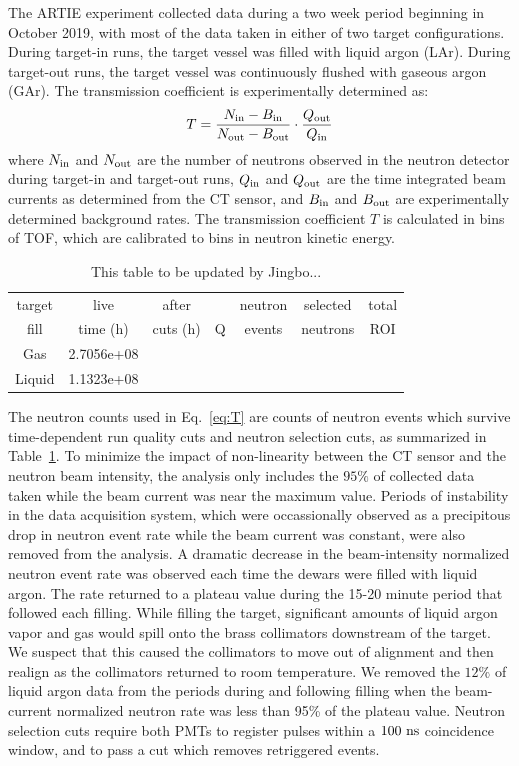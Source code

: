 \documentclass[%
 reprint,
superscriptaddress,
 preprintnumbers,
 nofootinbib,
 nobibnotes,
 bibnotes,
 amsmath,amssymb,
 aps,
 prl, 
 floatfix,
]{revtex4-1}
\begin{document}
The ARTIE experiment collected data during a two week period beginning
in October 2019, with most of the data taken in either of two target
configurations.  During target-in runs, the target vessel was filled
with liquid argon (LAr).  During target-out runs, the target vessel
was continuously flushed with gaseous argon (GAr).  The transmission
coefficient is experimentally determined as:
\begin{equation}
T = \frac{N_{\rm in} - B_{\rm in}}{N_{\rm out} - B_{\rm out}}\cdot\frac{Q_{\rm out}}{Q_{\rm in}}
\label{eq:T}
\end{equation}
where $N_{\rm in}$ and $N_{\rm out}$ are the number of neutrons
observed in the neutron detector during target-in and target-out runs,
$Q_{\rm in}$ and $Q_{\rm out}$ are the time integrated beam currents
as determined from the CT sensor, and $B_{\rm in}$ and $B_{\rm out}$
are experimentally determined background rates.  The transmission
coefficient $T$ is calculated in bins of TOF, which are calibrated to bins in neutron kinetic energy.

\begin{table}[htb]
\begin{tabular}{|c|c|c|c|c|c|c|}
\hline
target & live     & after    &   & neutron & selected & total \\
fill   & time (h) & cuts (h) & Q & events  & neutrons & ROI \\
\hline
Gas     & 2.7056e+08 & & & & &  \\
Liquid  & 1.1323e+08 & & & & &  \\
\hline
\end{tabular}
\caption{{\color{red} This table to be updated by Jingbo...}}
\label{tab:cutflow}
\end{table}

The neutron counts used in Eq.~\ref{eq:T} are counts of neutron events which
survive time-dependent run quality cuts and neutron selection
cuts, as summarized in Table~\ref{tab:cutflow}.  To minimize the
impact of non-linearity between the CT sensor and the neutron beam
intensity, the analysis only includes the $95\%$ of collected data
taken while the beam current was near the maximum value.  Periods of
instability in the data acquisition system, which were occassionally
observed as a precipitous drop in neutron event rate while the beam
current was constant, were also removed from the analysis.  A dramatic
decrease in the beam-intensity normalized neutron event rate was
observed each time the dewars were filled with liquid argon.  The rate
returned to a plateau value during the 15-20 minute period that
followed each filling.  While filling the target, significant amounts
of liquid argon vapor and gas would spill onto the brass collimators
downstream of the target.  We suspect that this caused the collimators
to move out of alignment and then realign as the collimators returned
to room temperature.  We removed the $12\%$ of liquid argon data from
the periods during and following filling when the beam-current
normalized neutron rate was less than 95\% of the plateau value.
Neutron selection cuts require both PMTs to register pulses within a 
$100~\rm ns$ coincidence window, and {\color{red} to pass a cut which removes retriggered events.}
\end{document}
